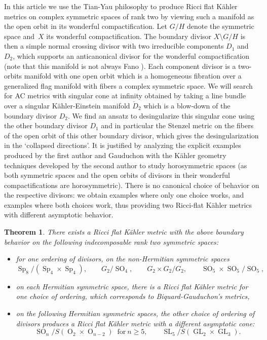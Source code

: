 \documentclass[JEP,XML,SOM,Unicode, NoEqCountersInSection, NoFloatCountersInSection]{cedram}
\DeclareMathOperator{\rO}{O}
\theoremstyle{plain}
\newtheorem{thm}{Theorem}[section]
\theoremstyle{definition}
\DeclareMathOperator{\SL}{SL}
\DeclareMathOperator{\Sp}{Sp}
\DeclareMathOperator{\SO}{SO}
\DeclareMathOperator{\GL}{GL}
\begin{document}
In this article we use the Tian-Yau philosophy to produce Ricci flat
Kähler metrics on complex symmetric spaces of rank two by viewing such
a manifold as the open orbit in its wonderful compactification.
Let $G/H$ denote the symmetric space and~$X$ its wonderful compactification.
The boundary divisor $X\setminus G/H$ is then a simple normal crossing divisor
with two irreducible components $D_1$ and $D_2$, which supports an anticanonical
divisor for the wonderful compactification (note that this manifold is not always
Fano \cite{Ruz12}). Each component divisor is a two-orbits manifold
with one open orbit which is a homogeneous fibration over a
generalized flag manifold with fibers a complex symmetric space. We
will search for AC metrics with singular cone at infinity obtained by
taking a line bundle over a singular Kähler-Einstein manifold $\check{D}_2$ which is
a blow-down of the boundary divisor $D_2$. We find an ansatz to
desingularize this singular cone using the other boundary divisor $D_1$ and
in particular the Stenzel metric on the fibers of the open orbit of
this other boundary divisor, which gives the desingularization in the
`collapsed directions'. It is justified by analyzing the explicit
examples produced by the first author and Gauduchon with the Kähler
geometry techniques developed by the second author to study
horosymmetric spaces \cite{DelHoro} (as both symmetric spaces and the
open orbits of divisors in their wonderful compactifications are
horosymmetric). There is no canonical choice of behavior on the
respective divisors: we obtain examples where only one choice works,
and examples where both choices work, thus providing two Ricci-flat
Kähler metrics with different asymptotic behavior.

\begin{thm}
There exists a Ricci flat Kähler metric with the above boundary behavior on the following
indecomposable rank two symmetric spaces:
\begin{itemize}
\item for one ordering of divisors, on the non-Hermitian symmetric spaces
\[ \Sp_8/(\Sp_4\times \Sp_4), \qquad G_2/\SO_4, \qquad G_2\times G_2/G_2, \qquad \SO_5\times \SO_5/\SO_5, \]
\item on each Hermitian symmetric space, there is a Ricci flat Kähler metric for one choice
of ordering, which corresponds to Biquard-Gauduchon's metrics,
\item on the following Hermitian symmetric spaces, the other choice of ordering of divisors produces a
Ricci flat Kähler metric with a different asymptotic cone:
\[ \SO_n/S(\rO_2\times \rO_{n-2})~\text{ for}~n\geq 5, \qquad
\SL_5/S(\GL_2\times \GL_3). \]
\end{itemize}
\end{thm}
\end{document}
